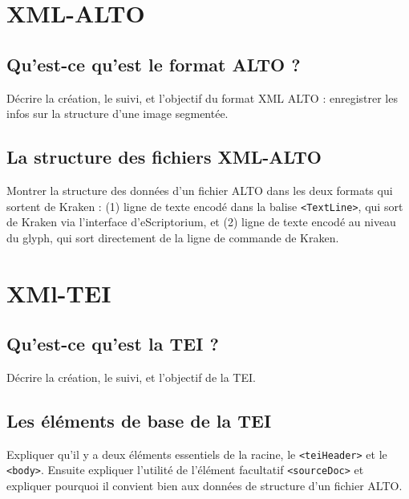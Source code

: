 \documentclass[class=article, crop=false]{standalone}
\begin{document}
\section{XML-ALTO}

\subsection{Qu'est-ce qu'est le format ALTO ?}

Décrire la création, le suivi, et l'objectif du format XML ALTO : enregistrer les infos sur la structure d'une image segmentée. 

\subsection{La structure des fichiers XML-ALTO}

Montrer la structure des données d'un fichier ALTO dans les deux formats qui sortent de Kraken : (1) ligne de texte encodé dans la balise \texttt{<TextLine>}, qui sort de Kraken via l'interface d'eScriptorium, et (2) ligne de texte encodé au niveau du glyph, qui sort directement de la ligne de commande de Kraken.

\section{XMl-TEI}

\subsection{Qu'est-ce qu'est la TEI ?}

Décrire la création, le suivi, et l'objectif de la TEI.

\subsection{Les éléments de base de la TEI}

Expliquer qu'il y a deux éléments essentiels de la racine, le \texttt{<teiHeader>} et le \texttt{<body>}. Ensuite expliquer l'utilité de l'élément facultatif \texttt{<sourceDoc>} et expliquer pourquoi il convient bien aux données de structure d'un fichier ALTO. 
\end{document}
